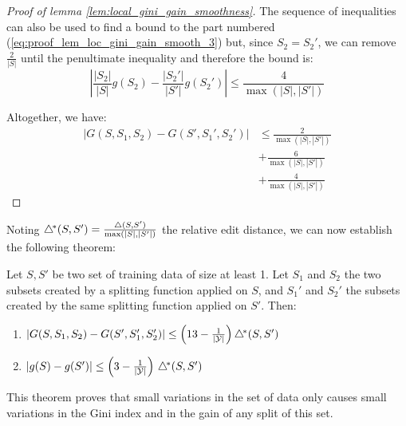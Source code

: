 \begin{proof}[Proof of lemma \ref{lem:local_gini_gain_smoothness}]
    The sequence of inequalities can also be used to find a bound to the part numbered (\ref{eq:proof_lem_loc_gini_gain_smooth_3}) but, since $S_2 = S_2'$, we can remove $\frac{2}{|S|}$ until the penultimate inequality and therefore the bound is:
    \begin{equation*}
        \left|\frac{|S_2|}{|S|}g(S_2) - \frac{|S_2'|}{|S'|}g(S_2')\right| \leq \frac{4}{\max(|S|, |S'|)}
    \end{equation*}

    Altogether, we have:
    \begin{equation*}
        \begin{split}
            |G(S, S_1, S_2) - G(S', S_1', S_2')| & \leq \frac{2}{\max(|S|, |S'|)}\\
            &+ \frac{6}{\max(|S|, |S'|)}\\
            &+ \frac{4}{\max(|S|, |S'|)}
        \end{split}
    \end{equation*}
\end{proof}

Noting $\triangle^{\!*}(S, S') = \frac{\triangle(S, S')}{\max(|S|, |S'|)}$ the relative edit distance, we can now establish the following theorem:

\begin{theorem}
\label{th:smoothness}
Let $S, S'$ be two set of training data of size at least 1. Let $S_1$ and $S_2$ the two subsets created by a splitting function applied on $S$, and $S_1'$ and $S_2'$ the subsets created by the same splitting function applied on $S'$. Then:
\begin{enumerate}
    \item $|G(S,S_1,S_2) - G(S',S_1',S_2')| \leq \left(13-\frac{1}{|\mathcal{Y}|}\right) \triangle^{\!*}(S,S')$
    \item $|g(S)-g(S')| \le \left(3 - \frac{1}{|\mathcal{Y}|}\right) \, \triangle^{\!*}(S,S')$
\end{enumerate}
\end{theorem}

This theorem proves that small variations in the set of data only causes small variations in the Gini index and in the gain of any split of this set.

